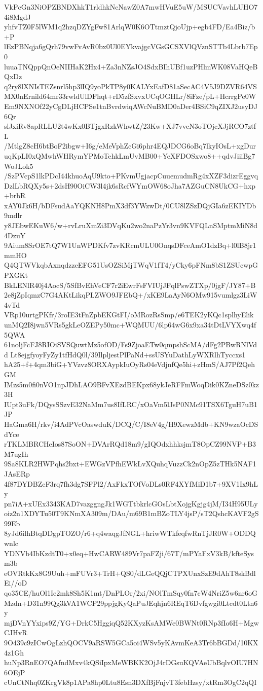 VkPcGn3NiOPZBNDXhkT1rldhkNcNawZ0A7mwHVuE5uW/MSUCVavhLUHO74i8MgdJ
yhfvTZ0F5lWM1q2hzqDZYgFw81ArlqW0K6OTtmztQjoUjp+egb4FD/Ea4Biz/b+P
lEzPBNqja6gQrh79vwFvAvR0bx0Ul0EYkvajgcVGsGCSXVlQVznSTTb4Lbrb7Ep0
luuaTNQppQnOeNIIHaK2Hx4+Za3nNZsJO4SdxBIhUBf1uzPHlmWK08VaHQeBQxDz
q2ry8lXNIsTEZsnrl5hp3lIQ9yoPkTP8y0KALYxEafD81aSecAC4V5J9DZVR64VS
MX0nErnild64mr33rwldUlDFhqt+rD5zfSxvxUCqOGHLr/8iFze/pL+HcrrgPe0W
Em9NXNOf22yCgDLjHCPSe1tnBvrdwiqAWcNuBMD0aDer4BSiC9qZIXJ2usyDJ6Qr
slJxiRv8apRLLU2t4wKx0BTjgxRzkWhwtZ/23Kw+XJ7vvcN3oTOjcXJjRCO7ztfL
/MtlgZ8cH6btBoF2ibgw+I6g/eMeVphZcGi6phr4EQJDCG6oBq7lkyIOsL+xgDur
uqKpLI0xQMwhWHRymYPMoTehkLmUvMB00+YeXFDOSxwo8++qdvJiiiBg7WoJLok5
/SzPVcpS1lkPDcI44khuoAqU9kto+PKvmUgjacpCuuemudmRg4xXZF3dizrEggvq
DzlLbRQXy5s+2dsH90OiCW3l4jk6sRcfWYmOW68oJha7AZGuCN8UkCG+hxp+brbR
xAY0Jk6H/bDFsudAaYQKNH8PmX3df3YWzwDt/0CU8lZSzDQjGIa6zEKIYDb9mdlr
y8JEbwEKuW6/w+rvLruXmZi3DVqKu2wo2naPzYr3vn9KVFQLnSMptmMiN8d4DzuY
9Aium8SrOE7tQ7W1UnWPDKfv7zvKRcmULU0OnqsDFceAmO1dzBq+l0lB8jr1mmHO
Q4QTWVkqbAxnqdzzeEFG51UsOZSiMjTWqV1fT4/yCky6pFNm8bS1ZSUcwpGPXGKt
BkLENlR40j4AocS/5SfBvEhVeCF7r2iEwrFsFVIUjJFqlPswZTXp/0jgF/JY87+B
2e8jZpIqmzC7G4AKtLikqPLZWO9JFEbQ+/xKE9LaAyN6OMw915vumlgz3LiW4vTd
VRp10urtgPKfr/3roIE3tFnZpbEKGtFI/oMRozRsSmp/e6TEK2yKQc1splhyElik
unMQ2I8jwn5VRs5gkLeOZEPy50mc+WQMUU/6lp64wG6x9xa34tDtLVYXwq4f5QWA
61noljFcFJ8RIOiSVSQuwtMz5ofOD/Fs9ZjoaETw0qmpshScMA/dFg2PBwRNlVdd
Lt8ejgfyoyFyZy1tfHdQ0l/39IlpljestPlPaNd+ssUSYuDathLyWXRlhTyccxs1
hA25+f+4qm3biG+YVzvz8ORXAypkIuOyRs04eVdjnfQe5hi+zHmS/AJ7Pf2QehGM
IMzs5m0fi0nVO1npJDhLAO9BFvXEzdBEKpx68ykJeRFFmWoqDik0KZneDSz0kz3H
IUpt3uFk/DQysSSzvE32NaMm7us8IfLRC/xOaVm5lJsP0NMc91TSX6TguH7uB1JP
HaGma6H/rkv/i4AdPVcOaswduK/DCQ/C/I8eV4g/H9XewzMdb+KN9wzaOcDSdYce
rTKLMBRCHeIos87SoON+DVArRQd18m9/gIQOdxhhksjmT8OpCZ99NVP+B3M7ugIh
9Sa8KLR2HWPqhs2bxt+EWGzVPfhEWkLvXQuhqVuzzCk2nOpZ5zTHk5NAF1JAsERp
4f87DYDBZcF3rq7fh3dg7SFPl2/AxFkxTOfVoDLs0RF4XYfMiD1b7+9XV1Ix9hLy
pn7iA+xUEx3343KAD7vazggngJk1WGTtbkrlcGOsLbtXojgKgjg4jM/I34H95ULy
oiz2n1XDYTu50T9KNmXA309m/DAu/m69B1mBZoTLY4jsP/sT2QshcKAVF2gS99Eb
8yJd6ilhBtqDDgpTOZO/r6+q4waqgJfNGL+hriwWTkfeqfwRnTjJR0W+ODDQwnlc
YDNVb4IbKzdtT0+x0eq+HwCARW489Vr7paFZji/67T/mPYaFxV3kB/kfteSysm3b
eOVRtkKx8G9Uuh+mFUVr3+TrH+QS0/dLGeQQjCTPXUnxSzE9dAhT8skBdlEi//oD
qo35CE/huOl1Ie2mk8Sh5K1mt/DnPLOr/2xi/NOlTmSqy0fn7cW4NriZ5w6nr6oG
Mzdn+D31n99Qg3kVA1WCP29ppjgKyQaPuJEqhjn6REqT6Dvfgwgi0Ltcdt0Ltn6y
mjDVnYYxips9Z/YG+DrkC5HggiqQ52KXyzKsAMWe0BWNt0RNp3fIo6H+MgwCJHvR
9O439c9zICwOgLzhQOCV9aRSW5GCa5oi4WSv5yKAvmKeA3Tr6bBGDd/10KX4z1Gh
huNp3RnEO7QAfndMxv4kQSiIpxMeWBKK2OjJ4rDGsuKQVAeUbBqlvOIU7HN6OEjP
cUnCtNhq0ZKrgVk8p1APa8hp0Ltu8Esn3DXfBjFnjvT3febHzsy/xtRm3OgC2qQI
